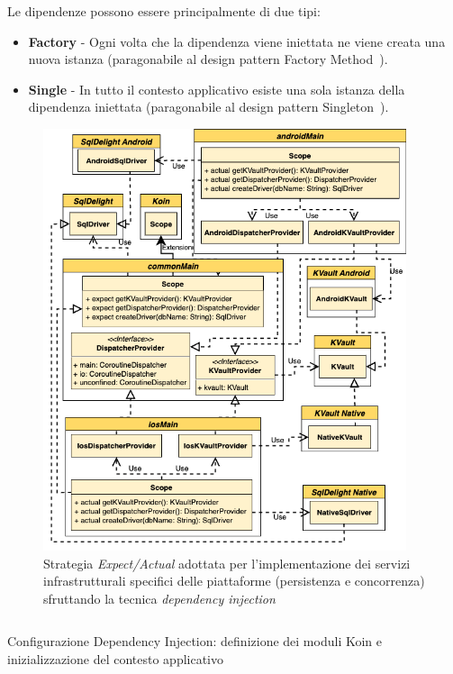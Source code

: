 Le dipendenze possono essere principalmente di due tipi:

\begin{itemize}
    \item \textbf{Factory} - Ogni volta che la dipendenza viene iniettata ne viene creata una nuova istanza (paragonabile al design pattern Factory Method~\cite{gamma1994design}).
    
    \item \textbf{Single} - In tutto il contesto applicativo esiste una sola istanza della dipendenza iniettata (paragonabile al design pattern Singleton~\cite{gamma1994design}).
\end{itemize}

\begin{figure}[H]
    \centering
    \includegraphics[width=0.95\textwidth]{img/expect-actual-shared.png}
    \caption{Strategia \textit{Expect/Actual} adottata per l'implementazione dei servizi infrastrutturali specifici delle piattaforme (persistenza e concorrenza) sfruttando la tecnica \textit{dependency injection}}
\end{figure}

\begin{listing}[H]
    \inputminted{kotlin}{code/shared-di-koin.kt}
    \caption{Configurazione Dependency Injection: definizione dei moduli Koin e inizializzazione del contesto applicativo}
\end{listing}

